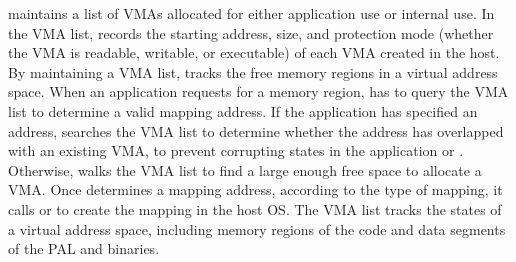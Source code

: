 \thelibos{} maintains a list of VMAs allocated for either application use
or internal use.
In the VMA list, \thelibos{} records
the starting address, size, and protection mode (whether the VMA is readable, writable, or executable) of each VMA created in the host.
By maintaining a VMA list, \thelibos{} tracks the free memory regions in a virtual address space.
When an application requests for a memory region,
\thelibos{} has to query the VMA list to determine a valid mapping address.
If the application has specified an address,
\thelibos{} searches the VMA list to determine whether the address has overlapped with an existing VMA, to prevent corrupting states in the application or \thelibos{}.
Otherwise, \thelibos{} walks the VMA list to find a large enough free space
to allocate a VMA. 
Once \thelibos{} determines a mapping address,
according to the type of mapping,
it calls  or  
to create the mapping in the host OS.
The VMA list tracks the states of a
virtual address space,
including memory regions of the code and data segments of the PAL and \thelibos{} binaries.



